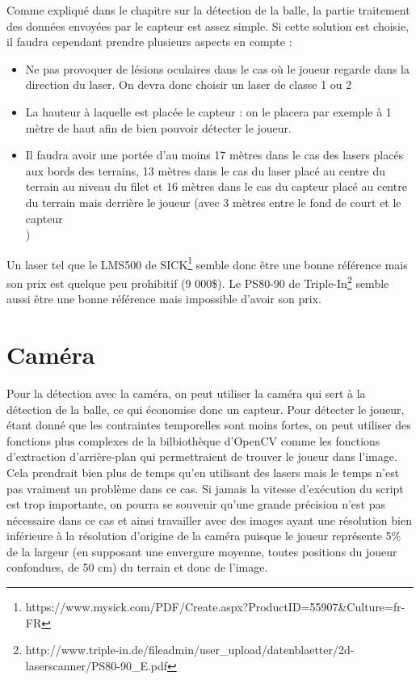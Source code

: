 Comme expliqué dans le chapitre sur la détection de la balle, la partie traitement des données envoyées par le capteur est assez simple. Si cette solution est choisie, il faudra cependant prendre plusieurs aspects en compte : 

\begin{itemize}
\item Ne pas provoquer de lésions oculaires dans le cas où le joueur regarde dans la direction du laser. On devra donc choisir un laser de classe 1 ou 2
\item La hauteur à laquelle est placée le capteur : on le placera par exemple à 1 mètre de haut afin de bien pouvoir détecter le joueur. 
\item Il faudra avoir une portée d'au moins 17 mètres dans le cas des lasers placés aux bords des terrains, 13 mètres dans le cas du laser placé au centre du terrain au niveau du filet et 16 mètres dans le cas du capteur placé au centre du terrain mais derrière le joueur (avec 3 mètres entre le fond de court et le capteur\\)
\end{itemize}

Un laser tel que le LMS500 de SICK\footnote{https://www.mysick.com/PDF/Create.aspx?ProductID=55907\&Culture=fr-FR} semble donc être une bonne référence mais son prix est quelque peu prohibitif (9 000\$). Le PS80-90 de Triple-In\footnote{http://www.triple-in.de/fileadmin/user\_upload/datenblaetter/2d-laserscanner/PS80-90\_E.pdf} semble aussi être une bonne référence mais impossible d'avoir son prix. 


\section{Caméra}

Pour la détection avec la caméra, on peut utiliser la caméra qui sert à la détection de la balle, ce qui économise donc un capteur. Pour détecter le joueur, étant donné que les contraintes temporelles sont moins fortes, on peut utiliser des fonctions plus complexes de la bilbiothèque d'OpenCV comme les fonctions d'extraction d'arrière-plan qui permettraient de trouver le joueur dans l'image. Cela prendrait bien plus de temps qu'en utilisant des lasers mais le temps n'est pas vraiment un problème dans ce cas. Si jamais la vitesse d'exécution du script est trop importante, on pourra se souvenir qu'une grande précision n'est pas nécessaire dans ce cas et ainsi travailler avec des images ayant une résolution bien inférieure à la résolution d'origine de la caméra puisque le joueur représente 5\% de la largeur (en supposant une envergure moyenne, toutes positions du joueur confondues, de 50 cm) du terrain et donc de l'image. \\ 


